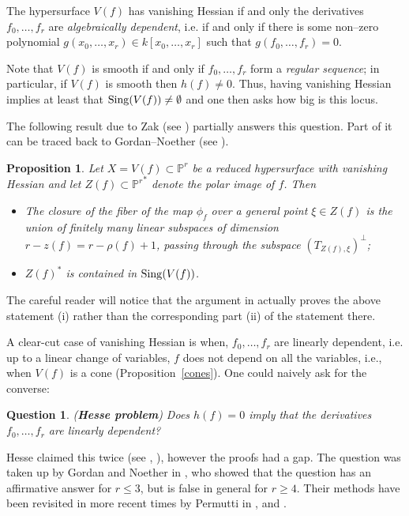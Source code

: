 \documentclass[11pt]{article}   %
\newtheorem{Proposition}[Theorem]{Proposition}
\newtheorem{Question}[Theorem]{Question}
\theoremstyle{definition}
\numberwithin{Theorem}{section} \numberwithin{equation}{section}
\newcommand{\p}{{\mathbb P}}
\begin{document}
{The hypersurface $V(f)$ has vanishing Hessian if and only the
derivatives $f_0,\ldots, f_r$ are {\it algebraically dependent},
i.e. if and only if there is some non--zero polynomial
$g(x_0,\ldots,x_r)\in k[x_0,\ldots,x_r]$ such that
$g(f_0,\ldots,f_r)= 0$.

Note that $V(f)$ is smooth if and only if $f_0,\ldots, f_r$ form a
{\it regular sequence}; in particular, if $V(f)$ is smooth then
$h(f)\neq 0$. Thus, having vanishing Hessian implies at least that
${\rm Sing}(V(f))\neq \emptyset$ and one then asks how big is this
locus.


The following result due to Zak (see \cite[Proposition 4.9]{ZakHesse})
partially answers this question. Part of it can be traced back to
Gordan--Noether (see \cite {GN}).

\begin{Proposition}\label{hessian} Let $X=V(f)\subset\p^r$ be a reduced
hypersurface with vanishing Hessian and let $Z(f)\subset {\p^r}^*$
denote the polar image of $f$. Then
\begin{itemize}
\item[{\rm (i)}] The closure of the fiber of the map $\phi_f$ over a general point
$\xi\in Z(f)$ is the union of finitely many linear subspaces of
dimension $r-z(f)=r-\rho(f)+1$, passing through the subspace
$(T_{Z(f),\xi})^\perp${\rm ;}
\item[{\rm (ii)}] $Z(f)^ *$ is contained in ${\rm Sing}(V(f))$.
\end{itemize}
\end{Proposition}

The careful reader will notice that the argument in
\cite[Proposition 4.9]{ZakHesse}
actually proves the above statement
(i) rather than the corresponding part (ii)
of the statement there.

A clear-cut case of vanishing Hessian is when, $f_0,\dots,f_r$
are linearly dependent, i.e. up to a linear change
of variables, $f$ does not depend on all the variables, i.e., when
$V(f)$ is a cone (Proposition~\ref{cones}). One could naively ask
for the converse:

\begin{Question}\label{Hessequestion}{\rm ({\bf Hesse problem})}
\rm Does $h(f)= 0$ imply that the derivatives $f_0,\ldots,f_r$ are
linearly dependent?
\end{Question}

Hesse claimed this twice (see \cite{Hesse1}, \cite{Hesse2}), however the
proofs had a gap. The question was taken up by Gordan and Noether
in \cite {GN}, who showed that the question has an affirmative
answer for $r\leq 3$, but is false in general for $r\geq 4$. Their
methods have been revisited in more recent times by Permutti in
\cite {Permutti1}, \cite {Permutti3} and \cite{Lossen}.

}
\end{document}
